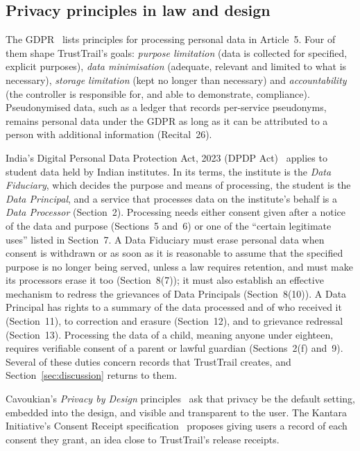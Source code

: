 \subsection{Privacy principles in law and design}
The GDPR~\cite{gdpr2016} lists principles for processing personal data in Article~5. Four of them shape TrustTrail's goals: \emph{purpose limitation} (data is collected for specified, explicit purposes), \emph{data minimisation} (adequate, relevant and limited to what is necessary), \emph{storage limitation} (kept no longer than necessary) and \emph{accountability} (the controller is responsible for, and able to demonstrate, compliance). Pseudonymised data, such as a ledger that records per-service pseudonyms, remains personal data under the GDPR as long as it can be attributed to a person with additional information (Recital~26).

India's Digital Personal Data Protection Act, 2023 (DPDP Act)~\cite{dpdp2023} applies to student data held by Indian institutes. In its terms, the institute is the \emph{Data Fiduciary}, which decides the purpose and means of processing, the student is the \emph{Data Principal}, and a service that processes data on the institute's behalf is a \emph{Data Processor} (Section~2). Processing needs either consent given after a notice of the data and purpose (Sections~5 and~6) or one of the ``certain legitimate uses'' listed in Section~7. A Data Fiduciary must erase personal data when consent is withdrawn or as soon as it is reasonable to assume that the specified purpose is no longer being served, unless a law requires retention, and must make its processors erase it too (Section~8(7)); it must also establish an effective mechanism to redress the grievances of Data Principals (Section~8(10)). A Data Principal has rights to a summary of the data processed and of who received it (Section~11), to correction and erasure (Section~12), and to grievance redressal (Section~13). Processing the data of a child, meaning anyone under eighteen, requires verifiable consent of a parent or lawful guardian (Sections~2(f) and~9). Several of these duties concern records that TrustTrail creates, and Section~\ref{sec:discussion} returns to them.

Cavoukian's \emph{Privacy by Design} principles~\cite{cavoukian2011pbd} ask that privacy be the default setting, embedded into the design, and visible and transparent to the user. The Kantara Initiative's Consent Receipt specification~\cite{kantarareceipt} proposes giving users a record of each consent they grant, an idea close to TrustTrail's release receipts.

